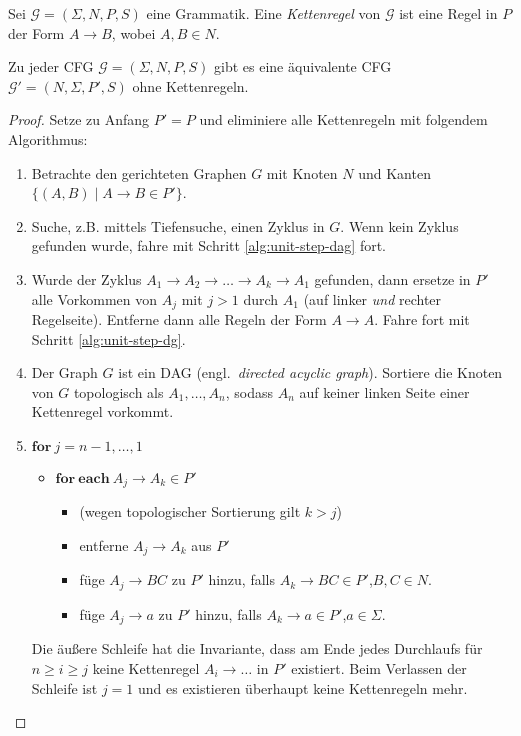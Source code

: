 \begin{Def}
  Sei $\mathcal{G} = (\Sigma, N, P, S)$ eine Grammatik.
  Eine \emph{Kettenregel} von $\mathcal{G}$ ist eine Regel in $P$ der Form $A \to B$, wobei $A,B \in N$.
\end{Def}

\begin{lemma}
  Zu jeder \ac{CFG} $\mathcal{G} = (\Sigma, N, P, S)$ gibt es eine äquivalente \ac{CFG} $\mathcal{G}' = (N, \Sigma, P', S)$ ohne Kettenregeln.
\end{lemma}
\begin{proof}
  Setze zu Anfang $P' = P$ und eliminiere alle Kettenregeln mit folgendem Algorithmus:
  \begin{enumerate}
  \item Betrachte den gerichteten Graphen $G$ mit Knoten $N$ und Kanten $\{(A, B) \mid A \to B \in P' \}$. \label{alg:unit-step-dg}
  \item Suche, z.B. mittels Tiefensuche, einen Zyklus in $G$.
    Wenn kein Zyklus gefunden wurde, fahre mit Schritt \ref{alg:unit-step-dag} fort.
  \item Wurde der Zyklus $A_1 \to A_2 \to \ldots \to A_k \to A_1$ gefunden, dann ersetze in $P'$ alle Vorkommen von $A_j$ mit $j > 1$ durch $A_1$ (auf linker \emph{und} rechter Regelseite).
    Entferne dann alle Regeln der Form $A \to A$.
    Fahre fort mit Schritt \ref{alg:unit-step-dg}.
  \item \label{alg:unit-step-dag}
    Der Graph $G$ ist ein \ac{DAG} (engl.\ \emph{directed acyclic graph}).
    Sortiere die Knoten von $G$ topologisch als $A_1, \ldots, A_n$, sodass $A_n$ auf keiner linken Seite einer Kettenregel vorkommt.
  \item $\mathbf{for}~j = n-1, \ldots, 1$ \label{alg:unit-step-chain}
    \begin{itemize}
    \item[] $\mathbf{for}~\mathbf{each}~A_j \to A_k \in P'$
      \begin{itemize}
      \item[] (wegen topologischer Sortierung gilt $k > j$)
      \item[] entferne $A_j \to A_k$ aus $P'$
      \item[] füge $A_j \to BC$ zu $P'$ hinzu, falls $A_k \to BC \in P'$,\quad $B,C \in N$.
      \item[] füge $A_j \to a$ zu $P'$ hinzu, falls $A_k \to a \in P'$,\quad $a \in \Sigma$.
      \end{itemize}
    \end{itemize}
    Die äußere Schleife hat die Invariante, dass am Ende jedes Durchlaufs für $n \ge i \ge j$ keine Kettenregel $A_i \to \ldots$ in $P'$ existiert.
    Beim Verlassen der Schleife ist $j = 1$ und es existieren überhaupt keine Kettenregeln mehr.
    \qedhere
  \end{enumerate}
\end{proof}
